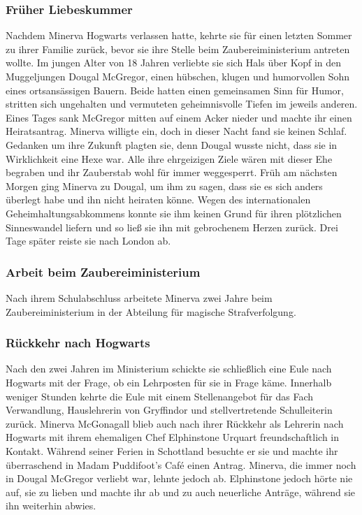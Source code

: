 \documentclass[a4paper, 10pt]{article}
\begin{document}
\subsubsection*{\large Früher Liebeskummer}
Nachdem Minerva Hogwarts verlassen hatte, kehrte sie für einen letzten Sommer zu ihrer Familie zurück, bevor sie ihre Stelle beim Zaubereiministerium antreten wollte.
\vspace{10pt}
\newline
{}  
Im jungen Alter von 18 Jahren verliebte sie sich Hals über Kopf in den Muggeljungen Dougal McGregor, einen hübschen, klugen und humorvollen Sohn eines ortsansässigen Bauern. Beide hatten einen gemeinsamen Sinn für Humor, stritten sich ungehalten und vermuteten geheimnisvolle Tiefen im jeweils anderen. Eines Tages sank McGregor mitten auf einem Acker nieder und machte ihr einen Heiratsantrag. Minerva willigte ein, doch in dieser Nacht fand sie keinen Schlaf. Gedanken um ihre Zukunft plagten sie, denn Dougal wusste nicht, dass sie in Wirklichkeit eine Hexe war. Alle ihre ehrgeizigen Ziele wären mit dieser Ehe begraben und ihr Zauberstab wohl für immer weggesperrt.
\vspace{10pt}
\newline
{}  
Früh am nächsten Morgen ging Minerva zu Dougal, um ihm zu sagen, dass sie es sich anders überlegt habe und ihn nicht heiraten könne. Wegen des internationalen Geheimhaltungsabkommens konnte sie ihm keinen Grund für ihren plötzlichen Sinneswandel liefern und so ließ sie ihn mit gebrochenem Herzen zurück. Drei Tage später reiste sie nach London ab.
\subsubsection*{\large Arbeit beim Zaubereiministerium}
Nach ihrem Schulabschluss arbeitete Minerva zwei Jahre beim Zaubereiministerium in der Abteilung für magische Strafverfolgung.
\subsubsection*{\large Rückkehr nach Hogwarts}
Nach den zwei Jahren im Ministerium schickte sie schließlich eine Eule nach Hogwarts mit der Frage, ob ein Lehrposten für sie in Frage käme. Innerhalb weniger Stunden kehrte die Eule mit einem Stellenangebot für das Fach Verwandlung, Hauslehrerin von Gryffindor und stellvertretende Schulleiterin zurück.
\vspace{10pt}
\newline
{}  
Minerva McGonagall blieb auch nach ihrer Rückkehr als Lehrerin nach Hogwarts mit ihrem ehemaligen Chef Elphinstone Urquart freundschaftlich in Kontakt. Während seiner Ferien in Schottland besuchte er sie und machte ihr überraschend in Madam Puddifoot's Café einen Antrag. Minerva, die immer noch in Dougal McGregor verliebt war, lehnte jedoch ab. Elphinstone jedoch hörte nie auf, sie zu lieben und machte ihr ab und zu auch neuerliche Anträge, während sie ihn weiterhin abwies.
\end{document}

